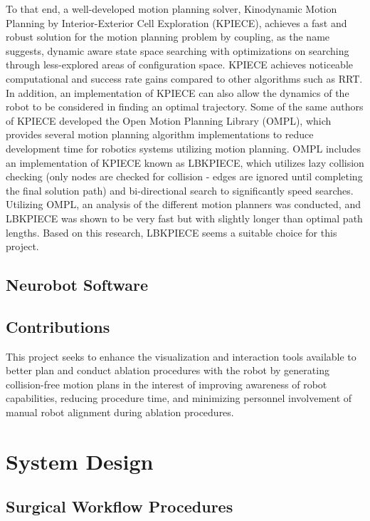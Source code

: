 \documentclass[12pt]{report}
\begin{document}
To that end, a well-developed motion planning solver, Kinodynamic Motion Planning by Interior-Exterior Cell Exploration (KPIECE), achieves a fast and robust solution for the motion planning problem by coupling, as the name suggests, dynamic aware state space searching with optimizations on searching through less-explored areas of configuration space. \cite{kpiece} KPIECE achieves noticeable computational and success rate gains compared to other algorithms such as RRT. \cite{kpiece} In addition, an implementation of KPIECE can also allow the dynamics of the robot to be considered in finding an optimal trajectory. Some of the same authors of KPIECE developed the Open Motion Planning Library (OMPL), which provides several motion planning algorithm implementations to reduce development time for robotics systems utilizing motion planning. \cite{ompl} OMPL includes an implementation of KPIECE known as LBKPIECE, which utilizes lazy collision checking (only nodes are checked for collision - edges are ignored until completing the final solution path) and bi-directional search to significantly speed searches. Utilizing OMPL, an analysis of the different motion planners was conducted, and LBKPIECE was shown to be very fast but with slightly longer than optimal path lengths. \cite{omplBenchmarks} Based on this research, LBKPIECE seems a suitable choice for this project.

\section{Neurobot Software}
\section{Contributions}
This project seeks to enhance the visualization and interaction tools available to better plan and conduct ablation procedures with the robot by generating collision-free motion plans in the interest of improving awareness of robot capabilities, reducing procedure time, and minimizing personnel involvement of manual robot alignment during ablation procedures.

\chapter{System Design}
\section{Surgical Workflow Procedures}
\end{document}
